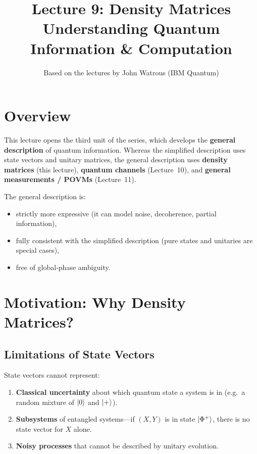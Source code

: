 \documentclass[11pt]{article}
\title{\textbf{Lecture 9: Density Matrices} \\ \large Understanding Quantum Information \& Computation}
\author{Based on the lectures by John Watrous (IBM Quantum)}
\date{}
\theoremstyle{definition}
\begin{document}
\maketitle
\tableofcontents
\newpage

\section{Overview}

This lecture opens the third unit of the series, which develops the \textbf{general description} of quantum information.  Whereas the simplified description uses state vectors and unitary matrices, the general description uses \textbf{density matrices} (this lecture), \textbf{quantum channels} (Lecture~10), and \textbf{general measurements / POVMs} (Lecture~11).

The general description is:
\begin{itemize}
    \item strictly more expressive (it can model noise, decoherence, partial information),
    \item fully consistent with the simplified description (pure states and unitaries are special cases),
    \item free of global-phase ambiguity.
\end{itemize}

\section{Motivation: Why Density Matrices?}

\subsection{Limitations of State Vectors}

State vectors cannot represent:
\begin{enumerate}
    \item \textbf{Classical uncertainty} about which quantum state a system is in (e.g.\ a random mixture of $\ket{0}$ and $\ket{+}$).
    \item \textbf{Subsystems} of entangled systems---if $(X,Y)$ is in state $\ket{\Phi^+}$, there is no state vector for $X$ alone.
    \item \textbf{Noisy processes} that cannot be described by unitary evolution.
\end{enumerate}
\end{document}
